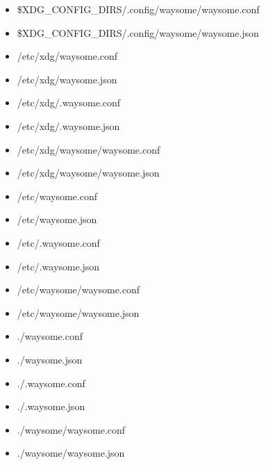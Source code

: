 \begin{itemize}
        \item \$XDG_CONFIG_DIRS/.config/waysome/waysome.conf
        \item \$XDG_CONFIG_DIRS/.config/waysome/waysome.json
        \item /etc/xdg/waysome.conf
        \item /etc/xdg/waysome.json
        \item /etc/xdg/.waysome.conf
        \item /etc/xdg/.waysome.json
        \item /etc/xdg/waysome/waysome.conf
        \item /etc/xdg/waysome/waysome.json
        \item /etc/waysome.conf
        \item /etc/waysome.json
        \item /etc/.waysome.conf
        \item /etc/.waysome.json
        \item /etc/waysome/waysome.conf
        \item /etc/waysome/waysome.json
        \item ./waysome.conf
        \item ./waysome.json
        \item ./.waysome.conf
        \item ./.waysome.json
        \item ./waysome/waysome.conf
        \item ./waysome/waysome.json
    \end{itemize}

